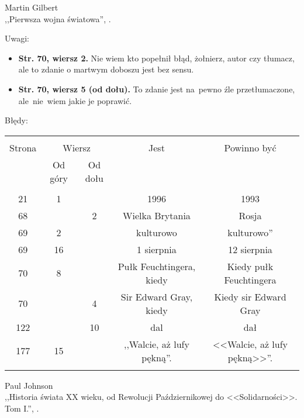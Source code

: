\documentclass[a4paper,11pt]{article}
\newcommand{\tb}{\textbf}
\newcommand{\StrWg}[2]{\textbf{Str. #1, wiersz #2.}}
\newcommand{\StrWd}[2]{\textbf{Str. #1, wiersz #2 (od dołu).}}
\begin{document}
\begin{center}
  Martin Gilbert \\
  ,,Pierwsza wojna światowa'', \cite{Gil03}.
\end{center}

Uwagi:
\begin{itemize}
\item[] \StrWg{70}{2} Nie wiem kto popełnił błąd, żołnierz, autor czy
  tłumacz, ale to zdanie o martwym doboszu jest bez sensu.
\item[] \StrWd{70}{5} To zdanie jest na~pewno źle przetłumaczone,
  ale~nie~wiem jakie je poprawić.
\end{itemize}

Błędy:\\
\begin{center}
  \begin{tabular}{|c|c|c|c|c|}
    \hline
    & \multicolumn{2}{c|}{} & & \\
    Strona & \multicolumn{2}{c|}{Wiersz}& Jest & Powinno być \\ \cline{2-3}
    & Od góry & Od dołu &  &  \\ \hline
    & & & & \\
    21 & 1 & & 1996 & 1993 \\
    68 & & 2 & Wielka Brytania & Rosja \\
    69 & 2 & & kulturowo & kulturowo'' \\
    69 & 16 & & 1 sierpnia & 12 sierpnia \\
    70 & 8 & & Pułk Feuchtingera, kiedy & Kiedy pułk Feuchtingera \\
    70 & & 4 & Sir Edward Gray, kiedy & Kiedy sir Edward Gray \\
    122 & & 10 & dal & dał \\
    177 & 15 & & ,,Walcie, aż lufy pękną''. & <<Walcie, aż lufy pękną>>''. \\
    & & & & \\ \hline
  \end{tabular}
\end{center}



\begin{center}
  Paul Johnson\\
  ,,Historia świata XX wieku, od Rewolucji Październikowej do
  <<Solidarności>>. Tom I.'', \cite{Joh09a}.
\end{center}
\end{document}
